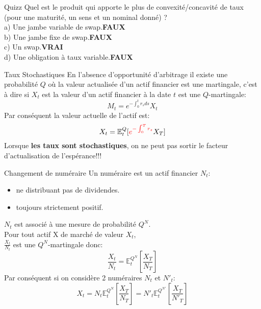 \documentclass{beamer}
\begin{document}
\begin{frame}{Quizz}
Quel est le produit qui apporte le plus de convexité/concavité de taux (pour une maturité, un sens et un nominal donné) ?\\
\vspace{0.5cm}
a) Une jambe variable de swap.\textbf{\color{red}FAUX}\\
b) Une jambe fixe de swap.\textbf{\color{red}FAUX}\\
c) Un swap.\textbf{\color{green}VRAI}\\
d) Une obligation à taux variable.\textbf{\color{red}FAUX}\\
\end{frame}

\begin{frame}{Taux Stochastiques}
En l'absence d'opportunité d'arbitrage il existe une probabilité $Q$ où la valeur actualisée d'un actif financier est une martingale, c'est à dire si $X_t$ est la valeur d'un actif financier à la date $t$ est une $Q$-martingale:
\[
	M_t = e^{-\int_0^t r_s ds}X_t
\]
Par conséquent la valeur actuelle de l'actif est:
\[
	X_t=\mathbb{E}^Q_t[\color{red} e^{-\int_0^T r_s} \color{black} X_T]
\]
Lorsque \color{red}\textbf{les taux sont stochastiques}\color{black}, on ne peut pas sortir le facteur d'actualisation de l'espérance!!!
\end{frame}

\begin{frame}{Changement de numéraire}
Un numéraire est un actif financier $N_t$:
\begin{itemize}
\item ne distribuant pas de dividendes.
\item toujours strictement positif.
\end{itemize}
\vspace{0.5cm}
$N_t$ est associé à une mesure de probabilité $Q^N$.\\
\vspace{0.5cm}
Pour tout actif X de marché de valeur $X_t$,\\
 $\frac{X_t}{N_t}$ est une $Q^N$-martingale donc:
\[
\frac{X_t}{N_t}=\mathbb{E}^{Q^N}_t\left[\frac{X_T}{N_T}\right]
\]
\vspace{0.5cm}
Par conséquent si on considère 2 numéraires $N_t$ et $N'_t$:\\
\[
X_t=N_t\mathbb{E}^{Q^N}_t\left[\frac{X_T}{N_T}\right]=N'_t\mathbb{E}^{Q^{N'}}_t\left[\frac{X_T}{N'_T}\right]
\]
\end{frame}
\end{document}
